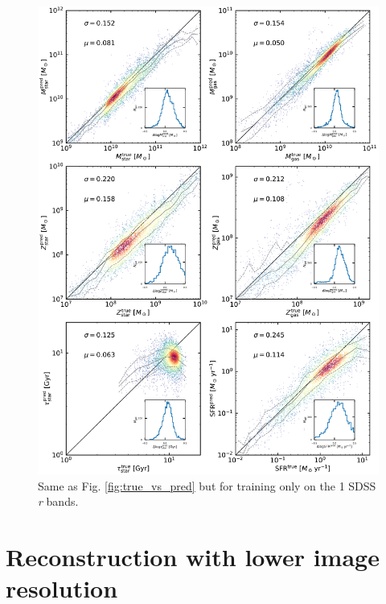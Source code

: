 \documentclass[conference]{IEEEtran}
\begin{document}
\begin{figure}
\vspace{-.4cm}
\begin{center}
\includegraphics[height=.5\textheight]{./plots/predicted_vs_true_all_masked_log_r.pdf}
\end{center}
\vspace{-.5cm}
\caption{Same as Fig. \ref{fig:true_vs_pred} but for training only on the 1 SDSS \textit{r} bands.}
\label{fig:true_vs_pred4}
\end{figure}

\section{Reconstruction with lower image resolution}
\label{sec:ap_res}
\end{document}
